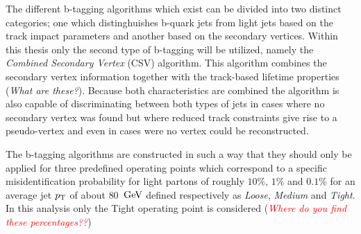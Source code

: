The different b-tagging algorithms which exist can be divided into two distinct categories; one which distinghuishes b-quark jets from light jets based on the track impact parameters and another based on the secondary vertices. Within this thesis only the second type of b-tagging will be utilized, namely the \textit{Combined Secondary Vertex} (CSV) algorithm. This algorithm combines the secondary vertex information together with the track-based lifetime properties (\textit{What are these?}). Because both characteristics are combined the algorithm is also capable of discriminating between both types of jets in cases where no secondary vertex was found but where reduced track constraints give rise to a pseudo-vertex and even in cases were no vertex could be reconstructed.

The b-tagging algorithms are constructed in such a way that they should only be applied for three predefined operating points which correspond to a specific misidentification probability for light partons of roughly $10 \%$, $1 \%$ and $0.1 \%$ for an average jet $p_{\rm T}$ of about $80$ $\, \mathrm{GeV}$ defined respectively as \textit{Loose}, \textit{Medium} and \textit{Tight}. In this analysis only the Tight operating point is considered (\textit{\textcolor{red}{Where do you find these percentages??}})




